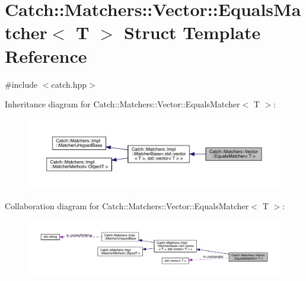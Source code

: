 \hypertarget{struct_catch_1_1_matchers_1_1_vector_1_1_equals_matcher}{}\section{Catch\+:\+:Matchers\+:\+:Vector\+:\+:Equals\+Matcher$<$ T $>$ Struct Template Reference}
\label{struct_catch_1_1_matchers_1_1_vector_1_1_equals_matcher}


{\ttfamily \#include $<$catch.\+hpp$>$}



Inheritance diagram for Catch\+:\+:Matchers\+:\+:Vector\+:\+:Equals\+Matcher$<$ T $>$\+:
\nopagebreak
\begin{figure}[H]
\begin{center}
\leavevmode
\includegraphics[width=350pt]{struct_catch_1_1_matchers_1_1_vector_1_1_equals_matcher__inherit__graph}
\end{center}
\end{figure}


Collaboration diagram for Catch\+:\+:Matchers\+:\+:Vector\+:\+:Equals\+Matcher$<$ T $>$\+:
\nopagebreak
\begin{figure}[H]
\begin{center}
\leavevmode
\includegraphics[width=350pt]{struct_catch_1_1_matchers_1_1_vector_1_1_equals_matcher__coll__graph}
\end{center}
\end{figure}

